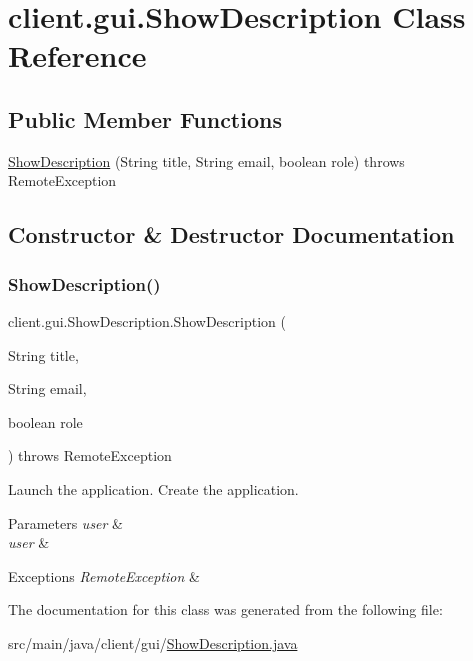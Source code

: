\hypertarget{classclient_1_1gui_1_1_show_description}{}\section{client.\+gui.\+Show\+Description Class Reference}
\label{classclient_1_1gui_1_1_show_description}
\subsection*{Public Member Functions}
\begin{DoxyCompactItemize}
\item 
\hyperlink{classclient_1_1gui_1_1_show_description_a1c2425fdf8ffa49c58f1757d278243fc}{Show\+Description} (String title, String email, boolean role)  throws Remote\+Exception 
\end{DoxyCompactItemize}


\subsection{Constructor \& Destructor Documentation}
\mbox{\label{classclient_1_1gui_1_1_show_description_a1c2425fdf8ffa49c58f1757d278243fc}} 
\subsubsection{\texorpdfstring{Show\+Description()}{ShowDescription()}}
{\footnotesize\ttfamily client.\+gui.\+Show\+Description.\+Show\+Description (\begin{DoxyParamCaption}\item[{String}]{title,  }\item[{String}]{email,  }\item[{boolean}]{role }\end{DoxyParamCaption}) throws Remote\+Exception}

Launch the application. Create the application. 
\begin{DoxyParams}{Parameters}
{\em user} & \\
\hline
{\em user} & \\
\hline
\end{DoxyParams}

\begin{DoxyExceptions}{Exceptions}
{\em Remote\+Exception} & \\
\hline
\end{DoxyExceptions}


The documentation for this class was generated from the following file\+:\begin{DoxyCompactItemize}
\item 
src/main/java/client/gui/\hyperlink{_show_description_8java}{Show\+Description.\+java}\end{DoxyCompactItemize}
